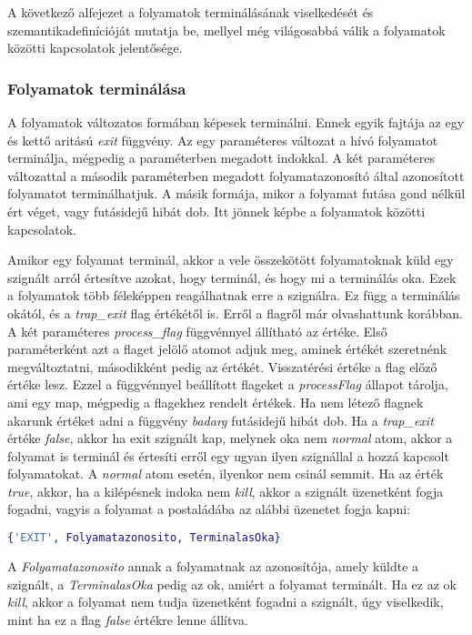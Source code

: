 A következő alfejezet a folyamatok terminálásának viselkedését és szemantikadefinícióját mutatja be, mellyel még világosabbá válik a folyamatok közötti kapcsolatok jelentősége.


\subsubsection{Folyamatok terminálása}

A folyamatok változatos formában képesek terminálni. Ennek egyik fajtája az egy és kettő aritású \textit{exit} függvény. Az egy paraméteres változat a hívó folyamatot terminálja, mégpedig a paraméterben megadott indokkal. A két paraméteres változattal a második paraméterben megadott folyamatazonosító által azonosított folyamatot terminálhatjuk. A másik formája, mikor a folyamat futása gond nélkül ért véget, vagy futásidejű hibát dob. Itt jönnek képbe a folyamatok közötti kapcsolatok.

Amikor egy folyamat terminál, akkor a vele összekötött folyamatoknak küld egy szignált arról értesítve azokat, hogy terminál, és hogy mi a terminálás oka. Ezek a folyamatok több féleképpen reagálhatnak erre a szignálra. Ez függ a terminálás okától, és a \textit{trap\_exit} flag értékétől is. Erről a flagről már olvashattunk korábban. A két paraméteres \textit{process\_flag} függvénnyel állítható az értéke. Első paraméterként azt a flaget jelölő atomot adjuk meg, aminek értékét szeretnénk megváltoztatni, másodikként pedig az értékét. Visszatérési értéke a flag előző értéke lesz. Ezzel a függvénnyel beállított flageket a \textit{processFlag} állapot tárolja, ami egy map, mégpedig a flagekhez rendelt értékek. Ha nem létező flagnek akarunk értéket adni a függvény \textit{badarg} futásidejű hibát dob. Ha a \textit{trap\_exit} értéke \textit{false}, akkor ha exit szignált kap, melynek oka nem \textit{normal} atom, akkor a folyamat is terminál és értesíti erről egy ugyan ilyen szignállal a hozzá kapcsolt folyamatokat. A \textit{normal} atom esetén, ilyenkor nem csinál semmit. Ha az érték \textit{true}, akkor, ha a kilépésnek indoka nem \textit{kill}, akkor a szignált üzenetként fogja fogadni, vagyis a folyamat a postaládába az alábbi üzenetet fogja kapni:

\begin{lstlisting}[language=Erlang]
{'EXIT', Folyamatazonosito, TerminalasOka}
\end{lstlisting}

A \textit{Folyamatazonosito} annak a folyamatnak az azonosítója, amely küldte a szignált, a \textit{TerminalasOka} pedig az ok, amiért a folyamat terminált. Ha ez az ok \textit{kill}, akkor a folyamat nem tudja üzenetként fogadni a szignált, úgy viselkedik, mint ha ez a flag \textit{false} értékre lenne állítva.

